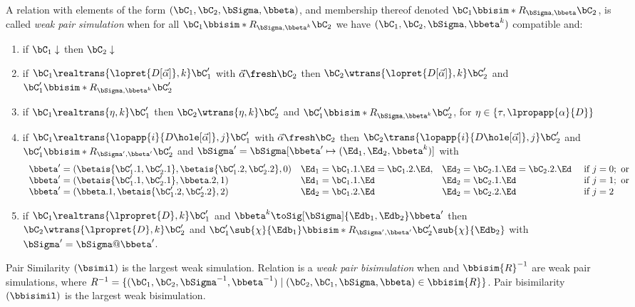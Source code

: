 \begin{definition}
  A relation  with elements of the form $(\bC_1,\bC_2,\bSigma,\bbeta)$, and membership thereof denoted $\bC_1 \bbisim*{R}_{\bSigma,\bbeta} \bC_2$, is called 
  \emph{weak pair simulation} when
  for all $\bC_1 \bbisim*{R}_{\bSigma,\bbeta^k} \bC_2$ we have $(\bC_1,\bC_2,\bSigma,\bbeta^k)$ compatible
 and:
  \begin{enumerate}
    \item[0.]
      if $\bC_1\downarrow$
      then $\bC_2\downarrow$
    \item
      if $\bC_1 \realtrans{\lopret{D[\vec\alpha]},k} \bC_1'$ with  $\vec\alpha\fresh \bC_2$ 
      then $\bC_2 \wtrans{\lopret{D[\vec\alpha]},k} \bC_2'$ and
      $\bC_1' \bbisim*{R}_{\bSigma,\bbeta^k} \bC_2'$
    \item
      if $\bC_1 \realtrans{\eta,k} \bC_1'$
      then $\bC_2 \wtrans{\eta,k} \bC_2'$ and
      $\bC_1' \bbisim*{R}_{\bSigma,\bbeta^k} \bC_2'$, for $\eta\in\{\tau,\lpropapp{\alpha}{D}\}$
    \item
      if $\bC_1 \realtrans{\lopapp{i}{D\hole[\vec \alpha]},j}  \bC_1'$ with  $\vec\alpha\fresh \bC_2$ 
      then $\bC_2 \trans{\lopapp{i}{D\hole[\vec \alpha]},j}  \bC_2'$
      and
      $\bC_1' \bbisim*{R}_{\bSigma',\bbeta'} \bC_2'$
      and $\bSigma' = \bSigma[\bbeta' \mapsto (\Ed_1, \Ed_2, \bbeta^k)]$
      with 
      \begin{gather*}\begin{array}{lllll}
        \bbeta' = (\betais{\bC_1'.1,\bC_2'.1}, \betais{\bC_1'.2,\bC_2'.2}, 0) & \Ed_1 = \bC_1.1.\Ed = \bC_1.2.\Ed, & \Ed_2 = \bC_2.1.\Ed = \bC_2.2.\Ed & \text{ if } j = 0; \text{ or}\\
        \bbeta' = (\betais{\bC_1'.1,\bC_2'.1}, \bbeta.2, 1)                   & \Ed_1 = \bC_1.1.\Ed                & \Ed_2 =\bC_2.1.\Ed                & \text{ if } j = 1; \text{ or}\\
        \bbeta' = (\bbeta.1, \betais{\bC_1'.2,\bC_2'.2}, 2)                   & \Ed_2 = \bC_1.2.\Ed                & \Ed_2 =\bC_2.2.\Ed                & \text{ if } j = 2\phantom{; \text{ or}}
      \end{array}\end{gather*}
    \item
      if $\bC_1 \realtrans{\lpropret{D},k} \bC_1'$
      and
      $\bbeta^k{\toSig[\bSigma]{\Edb_1,\Edb_2}}\bbeta'$
      then $\bC_2 \wtrans{\lpropret{D},k} \bC_2'$
      and
      $\bC_1'\sub{\chi}{\Edb_1} \bbisim*{R}_{\bSigma',\bbeta'} \bC_2'\sub{\chi}{\Edb_2}$ with $\bSigma'=\bSigma@\bbeta'$.
    \end{enumerate}
  Pair Similarity $(\bsimil)$ is the largest weak simulation.
  Relation  is a \emph{weak pair bisimulation} when  and $\bbisim{R}^{-1}$ are weak pair simulations, where $R^{-1}=\{(\bC_1,\bC_2,\bSigma^{-1},\bbeta^{-1})\mid (\bC_2,\bC_1,\bSigma,\bbeta)\in \bbisim{R}\}$.
  Pair bisimilarity $(\bbisimil)$ is the largest weak bisimulation.
\end{definition}


